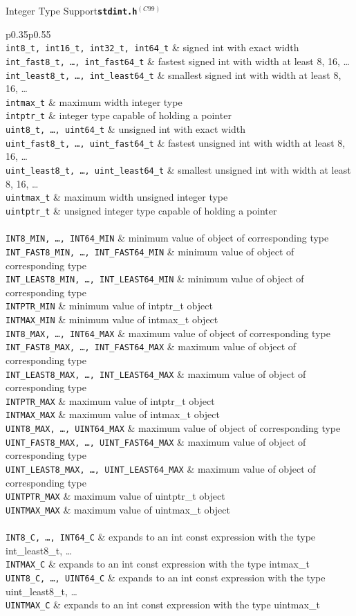 \documentclass{article}
\newcommand{\newstd}{\ensuremath{^{(C99)}}\xspace}
\newcommand{\librarysection}[5]{{\vspace{2ex}\large #1\quad\textbf{\texttt{#2}}}\par\begin{supertabular}{p{#3\linewidth}p{#4\linewidth}}#5\end{supertabular}}
\newcommand{\funcdescription}[2]{\texttt{#1} & #2 \\}
\newcommand{\smallheader}[1]{\multicolumn{2}{c}{#1} \\}
\begin{document}
\begin{multicols*}{3}
\librarysection{Integer Type Support}{stdint.h\newstd}{0.35}{0.55}{
\smallheader{\underline{Types}}
\funcdescription{int8\_t, int16\_t, int32\_t, int64\_t}{signed int with exact width}
\funcdescription{int\_fast8\_t, \dots, int\_fast64\_t}{fastest signed int with width at least 8, 16, \dots}
\funcdescription{int\_least8\_t, \dots, int\_least64\_t}{smallest signed int with width at least 8, 16, \dots}
\funcdescription{intmax\_t}{maximum width integer type}
\funcdescription{intptr\_t}{integer type capable of holding a pointer}
\funcdescription{uint8\_t, \dots, uint64\_t}{unsigned int with exact width}
\funcdescription{uint\_fast8\_t, \dots, uint\_fast64\_t}{fastest unsigned int with width at least 8, 16, \dots}
\funcdescription{uint\_least8\_t, \dots, uint\_least64\_t}{smallest unsigned int with width at least 8, 16, \dots}
\funcdescription{uintmax\_t}{maximum width unsigned integer type}
\funcdescription{uintptr\_t}{unsigned integer type capable of holding a pointer}
\smallheader{\underline{Constants}}
\funcdescription{INT8\_MIN, \dots, INT64\_MIN}{minimum value of object of corresponding type}
\funcdescription{INT\_FAST8\_MIN, \dots, INT\_FAST64\_MIN}{minimum value of object of corresponding type}
\funcdescription{INT\_LEAST8\_MIN, \dots, INT\_LEAST64\_MIN}{minimum value of object of corresponding type}
\funcdescription{INTPTR\_MIN}{minimum value of intptr\_t object}
\funcdescription{INTMAX\_MIN}{minimum value of intmax\_t object}
\funcdescription{INT8\_MAX, \dots, INT64\_MAX}{maximum value of object of corresponding type}
\funcdescription{INT\_FAST8\_MAX, \dots, INT\_FAST64\_MAX}{maximum value of object of corresponding type}
\funcdescription{INT\_LEAST8\_MAX, \dots, INT\_LEAST64\_MAX}{maximum value of object of corresponding type}
\funcdescription{INTPTR\_MAX}{maximum value of intptr\_t object}
\funcdescription{INTMAX\_MAX}{maximum value of intmax\_t object}
\funcdescription{UINT8\_MAX, \dots, UINT64\_MAX}{maximum value of object of corresponding type}
\funcdescription{UINT\_FAST8\_MAX, \dots, UINT\_FAST64\_MAX}{maximum value of object of corresponding type}
\funcdescription{UINT\_LEAST8\_MAX, \dots, UINT\_LEAST64\_MAX}{maximum value of object of corresponding type}
\funcdescription{UINTPTR\_MAX}{maximum value of uintptr\_t object}
\funcdescription{UINTMAX\_MAX}{maximum value of uintmax\_t object}
\smallheader{\underline{Function Macro}}
\funcdescription{INT8\_C, \dots, INT64\_C}{expands to an int const expression with the type int\_least8\_t, \dots}
\funcdescription{INTMAX\_C}{expands to an int const expression with the type intmax\_t}
\funcdescription{UINT8\_C, \dots, UINT64\_C}{expands to an int const expression with the type uint\_least8\_t, \dots}
\funcdescription{UINTMAX\_C}{expands to an int const expression with the type uintmax\_t}
}


\end{multicols*}
\end{document}
